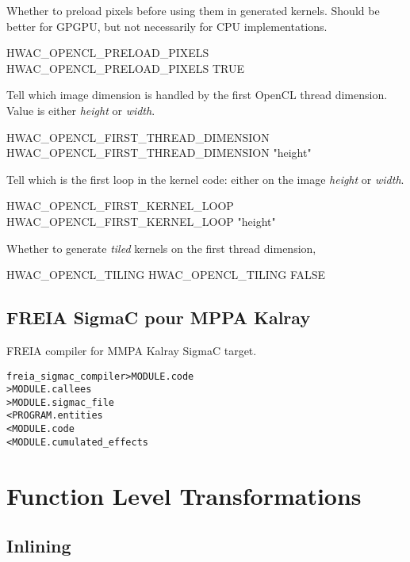 \documentclass[a4paper]{report}
\newenvironment{PipsMake}{\begin{alltt}}{\end{alltt}}
\begin{document}
Whether to preload pixels before using them in generated kernels.
Should be better for GPGPU, but not necessarily for CPU implementations.
\begin{PipsProp}{HWAC_OPENCL_PRELOAD_PIXELS}
HWAC_OPENCL_PRELOAD_PIXELS TRUE
\end{PipsProp}

Tell which image dimension is handled by the first OpenCL thread dimension.
Value is either \emph{height} or \emph{width}.
\begin{PipsProp}{HWAC_OPENCL_FIRST_THREAD_DIMENSION}
HWAC_OPENCL_FIRST_THREAD_DIMENSION "height"
\end{PipsProp}

Tell which is the first loop in the kernel code: either on the image
\emph{height} or \emph{width}.
\begin{PipsProp}{HWAC_OPENCL_FIRST_KERNEL_LOOP}
HWAC_OPENCL_FIRST_KERNEL_LOOP "height"
\end{PipsProp}

Whether to generate \emph{tiled} kernels on the first thread dimension,
\begin{PipsProp}{HWAC_OPENCL_TILING}
HWAC_OPENCL_TILING FALSE
\end{PipsProp}


\subsection{FREIA SigmaC pour MPPA Kalray}
\label{hwac-freia-opencl}

FREIA compiler for MMPA Kalray SigmaC target.

\begin{PipsMake}
freia_sigmac_compiler > MODULE.code
                      > MODULE.callees
                      > MODULE.sigmac_file
        < PROGRAM.entities
        < MODULE.code
        < MODULE.cumulated_effects
\end{PipsMake}


\section{Function Level Transformations}



\subsection{Inlining}
\label{subsection-inlining}
\end{document}
